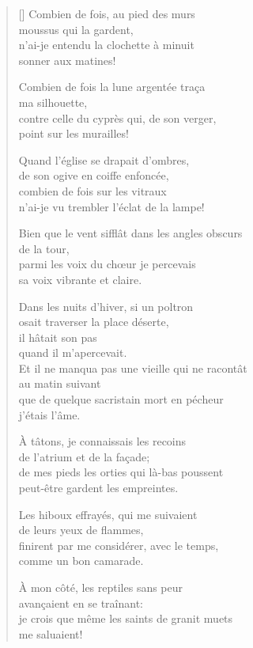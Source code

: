 \documentclass[a4paper,12pt]{book}
\begin{document}
\settowidth{\versewidth}{Bien que le vent sifflât dans les angles obscurs}

\begin{verse}[\versewidth]
  Combien de fois, au pied des murs \\
  moussus qui la gardent, \\
  n'ai-je entendu la clochette à minuit \\
  sonner aux matines!

  Combien de fois la lune argentée traça \\
  ma silhouette, \\
  contre celle du cyprès qui, de son verger, \\
  point sur les murailles!

  Quand l'église se drapait d'ombres, \\
  de son ogive en coiffe enfoncée, \\
  combien de fois sur les vitraux \\
  n'ai-je vu trembler l'éclat de la lampe!

  Bien que le vent sifflât dans les angles obscurs \\
  de la tour, \\
  parmi les voix du chœur je percevais \\
  sa voix vibrante et claire.

  Dans les nuits d'hiver, si un poltron \\
  osait traverser la place déserte, \\
  il hâtait son pas \\
  quand il m'apercevait. \\

  Et il ne manqua pas une vieille qui ne racontât \\
  au matin suivant \\
  que de quelque sacristain mort en pécheur \\
  j'étais l'âme.

  À tâtons, je connaissais les recoins \\
  de l'atrium et de la façade; \\
  de mes pieds les orties qui là-bas poussent \\
  peut-être gardent les empreintes.

  Les hiboux effrayés, qui me suivaient \\
  de leurs yeux de flammes, \\
  finirent par me considérer, avec le temps, \\
  comme un bon camarade.

  À mon côté, les reptiles sans peur \\
  avançaient en se traînant: \\
  je crois que même les saints de granit muets \\
  me saluaient!
\end{verse}
\end{document}
